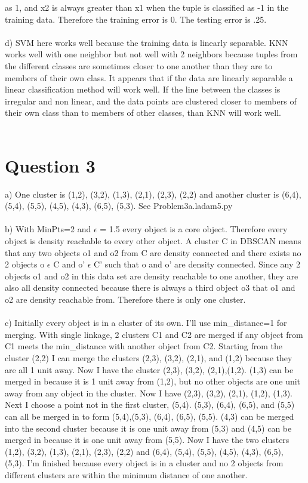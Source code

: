 \documentclass{article}
\begin{document}
 as 1, and x2 is always greater than x1 when the tuple is classified as -1 in the training data. Therefore the training error is 0.  The testing error
is .25.\\\\
d)  SVM here works well because the training data is linearly separable.  KNN works well with one neighbor but not well with 2 neighbors because tuples from
the different classes are sometimes closer to one another than they are to members of their own class.  It appears that if the data are linearly separable
a linear classification method will work well.  If the line between the classes is irregular and non linear, and the data points are clustered
closer to members of their own class than to members of other classes, than KNN will work well.\\\\

\section{Question 3}
a) One cluster is {(1,2), (3,2), (1,3), (2,1), (2,3), (2,2)} and another cluster is {(6,4), (5,4), (5,5), (4,5), (4,3), (6,5), (5,3)}.  See 
Problem3a.ladam5.py\\\\
b) With MinPts=2 and $\epsilon$ = 1.5 every object is a core object.  Therefore every object is density reachable to every other object.  A cluster C in 
DBSCAN means that any two objects o1 and o2 from C are density connected and there exists no 2 objects o $\epsilon$ C and o' $\epsilon$ C' such that 
o and o' are density connected.  Since any 2 objects o1 and o2 in this data set are density reachable to one another, they are also all density connected 
because there is always a third object o3 that o1 and o2 are density reachable from.  Therefore there is only one cluster.\\\\
c) Initially every object is in a cluster of its own.  I'll use min\_distance=1 for merging.  With single linkage, 2 clusters C1 and C2 are merged
 if any object from C1 meets the min\_distance with another object from C2.  Starting from the cluster (2,2) I can merge the clusters (2,3), (3,2), 
 (2,1), and (1,2) because they are all 1 unit away.  Now I have the cluster {(2,3), (3,2), (2,1),(1,2)}.  (1,3) can be merged in because it is 1 unit 
 away from (1,2), but no other objects are one unit away from any object in the cluster.  Now I have {(2,3), (3,2), (2,1), (1,2), (1,3)}.  Next I 
 choose a point not in the first cluster, (5,4).  (5,3), (6,4), (6,5), and (5,5) can all be merged in to form {(5,4),(5,3), (6,4), (6,5), (5,5)}. (4,3) 
 can be merged into the second cluster because it is one unit away from (5,3) and (4,5) can be merged in because it is one unit away from (5,5). 
 Now I have the two clusters {(1,2), (3,2), (1,3), (2,1), (2,3), (2,2)} and {(6,4), (5,4), (5,5), (4,5), (4,3), (6,5), (5,3)}.  I'm finished because 
 every object is in a cluster and no 2 objects from different clusters are within the minimum distance of one another.
 
\end{document}
